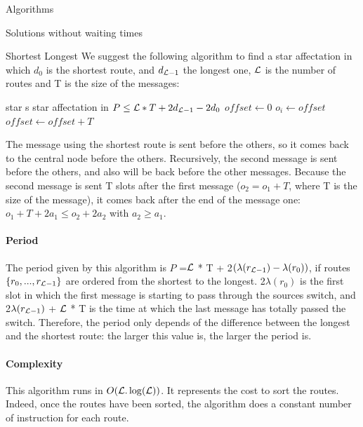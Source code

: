 \documentclass[a4paper,10pt]{report}
\begin{document}
\begin{chapter}{Algorithms}
\begin{section}{Solutions without waiting times}
\begin{subsection}{Shortest Longest}
We suggest the following algorithm to find a star affectation in which $d_0$ is the shortest route, and $d_{{\cal L}-1}$ the longest one, 
${\cal L}$ is the number of routes and T is the size of the messages:

\begin{algorithm}[H]
\caption{Star affectation from shortest to longest}
\begin{algorithmic}

\REQUIRE star s
\ENSURE star affectation in $P \le {\cal L}*T + 2d_{{\cal L}-1} - 2d_0$
\STATE $offset \leftarrow 0$
\STATE $o_i \leftarrow offset$
\STATE $offset \leftarrow offset+T$
\ENDFOR

\end{algorithmic}
\end{algorithm}


The message using the shortest route is sent before the others, so it comes back to the central node before the others.
Recursively, the second message is sent before the others, and also will be back before the other messages. 
Because the second message is sent T slots after the first message ($o_2 = o_1 + T$, where T is the size of the message), it comes back after
the end of the message one: $o_1+ T + 2a_1 \le o_2 + 2a_2$ with $a_2 \ge a_1$.

\paragraph{Period}
The period given by this algorithm is $P$ =${\cal L}$ * T + 2$(\lambda(r_{{\cal L}-1}) - \lambda(r_0))$, if routes $\{r_0,...,r_{{\cal L}-1}\}$ are ordered
from the shortest to the longest. 2$\lambda(r_0)$ is the first slot in which the first message is starting to pass through the sources switch,
and 2$\lambda(r_{{\cal L}-1})$ + ${\cal L}$ * T  is the time at which the last message has totally passed the switch.
Therefore, the period only depends of the difference between the longest and the shortest route: the larger this value is, the larger
the period is.

\paragraph{Complexity}
This algorithm runs in $O({\cal L}.\log({\cal L}))$. It represents the cost to sort the routes.
Indeed, once the routes have been sorted, the algorithm does a constant number of instruction for each route.
\end{subsection}


\end{section}
\end{chapter}
\end{document}
